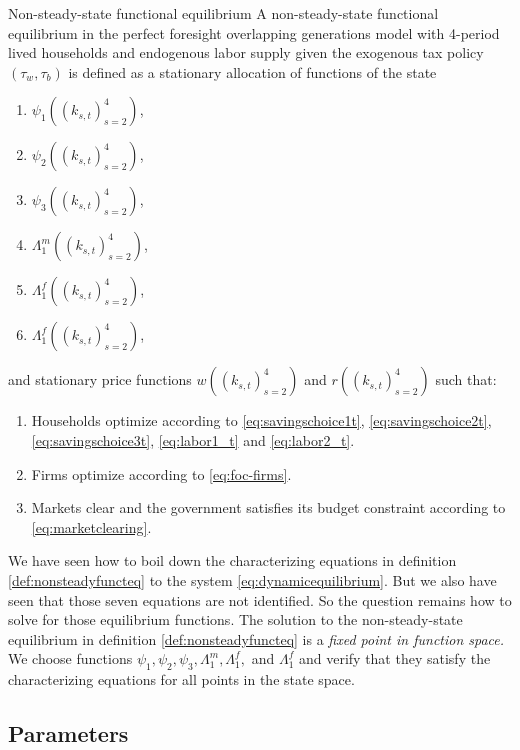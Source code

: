 \documentclass[ProjectUYA]{subfiles}
\begin{document}
 \begin{definition}
 	{Non-steady-state functional equilibrium}
 	\label{def:nonsteadyfuncteq}
 	A non-steady-state functional equilibrium in the perfect foresight overlapping generations model with 4-period lived households and endogenous labor supply given the exogenous tax policy $(\tau_w,\tau_b)$ is defined as a stationary allocation of functions of the state 
 	\begin{enumerate}
 		\item $\psi_1((k_{s,t})_{s=2}^4)$,
 		\item $\psi_2((k_{s,t})_{s=2}^4)$,
 		\item $\psi_3((k_{s,t})_{s=2}^4)$,
 		\item $\Lambda_1^m((k_{s,t})_{s=2}^4)$,
 		\item $\Lambda_1^f((k_{s,t})_{s=2}^4)$,
 		\item $\Lambda_1^f((k_{s,t})_{s=2}^4)$,
 	\end{enumerate}
and stationary price functions $w((k_{s,t})_{s=2}^4)$ and $r((k_{s,t})_{s=2}^4)$ such that:
\begin{enumerate}
	\item Households optimize according to \eqref{eq:savingschoice1t}, \eqref{eq:savingschoice2t},
	 \eqref{eq:savingschoice3t}, \eqref{eq:labor1_t} and \eqref{eq:labor2_t}.
	\item Firms optimize according to \eqref{eq:foc-firms}.
	\item Markets clear and the government satisfies its budget constraint according to \eqref{eq:marketclearing}.
\end{enumerate}
 \end{definition}

 We have seen how to boil down the characterizing equations in definition \ref{def:nonsteadyfuncteq} to the system 
 \eqref{eq:dynamicequilibrium}. But we also have seen that those seven equations are not identified. So the question remains how to solve for those equilibrium functions. The solution to the non-steady-state equilibrium in definition \ref{def:nonsteadyfuncteq} is a \emph{fixed point in function space.} We choose functions $\psi_1,\psi_2,\psi_3,\Lambda_1^m,\Lambda_1^f,$ and $\Lambda_1^f$ and verify that they satisfy the characterizing equations for all points in the state space. 
 

\subsection{Parameters}
\end{document}
